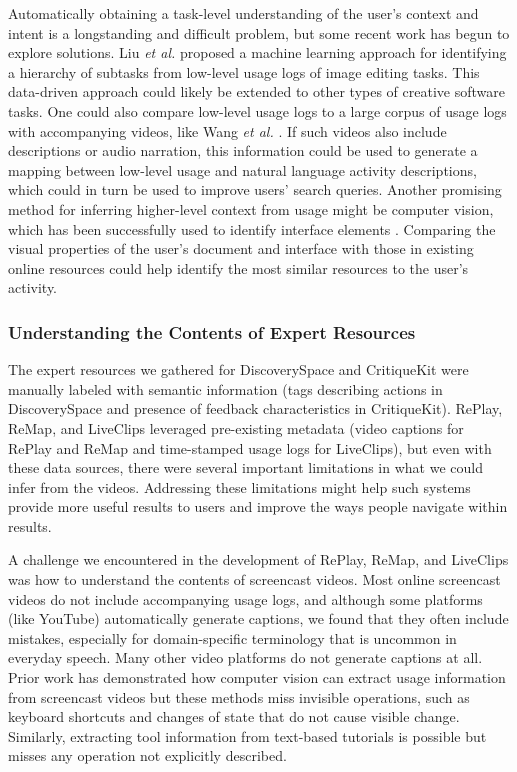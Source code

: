 Automatically obtaining a task-level understanding of the user's context and intent is a longstanding and difficult problem, but some recent work has begun to explore solutions. Liu \textit{et al.} \cite{Liu2020} proposed a machine learning approach for identifying a hierarchy of subtasks from low-level usage logs of image editing tasks. This data-driven approach could likely be extended to other types of creative software tasks. One could also compare low-level usage logs to a large corpus of usage logs with accompanying videos, like Wang \textit{et al.} \cite{Wang2018}. If such videos also include descriptions or audio narration, this information could be used to generate a mapping between low-level usage and natural language activity descriptions, which could in turn be used to improve users' search queries. Another promising method for inferring higher-level context from usage might be computer vision, which has been successfully used to identify interface elements \cite{Chang2011, Hurst2010, Dixon2010}. Comparing the visual properties of the user's document and interface with those in existing online resources could help identify the most similar resources to the user's activity.

\subsubsection{Understanding the Contents of Expert Resources}
The expert resources we gathered for Discovery\-Space and CritiqueKit were manually labeled with semantic information (tags describing actions in Discovery\-Space and presence of feedback characteristics in CritiqueKit). RePlay, ReMap, and LiveClips leveraged pre-existing metadata (video captions for RePlay and ReMap and time-stamped usage logs for LiveClips), but even with these data sources, there were several important limitations in what we could infer from the videos. Addressing these limitations might help such systems provide more useful results to users and improve the ways people navigate within results.

A challenge we encountered in the development of RePlay, ReMap, and LiveClips was how to understand the contents of screencast videos. Most online screencast videos do not include accompanying usage logs, and although some platforms (like YouTube) automatically generate captions, we found that they often include mistakes, especially for domain-specific terminology that is uncommon in everyday speech. Many other video platforms do not generate captions at all. Prior work has demonstrated how computer vision can extract usage information from screencast videos \cite{Banovic2012, Pongnumkul2011} but these methods miss invisible operations, such as keyboard shortcuts and changes of state that do not cause visible change. Similarly, extracting tool information from text-based tutorials is possible \cite{Pavel2013, Fourney2014Mining, Fourney2012, Fourney2011} but misses any operation not explicitly described. 

